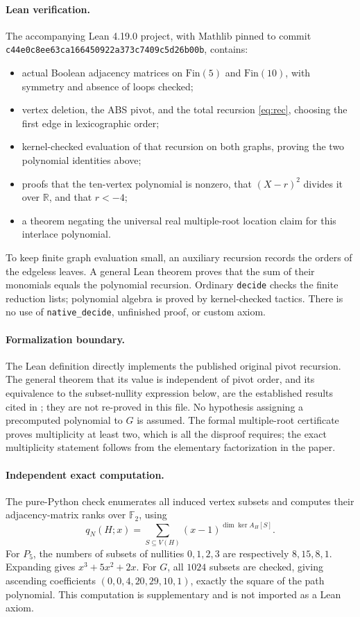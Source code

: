 \documentclass[11pt]{article}
\newcommand{\qN}{q_N}
\begin{document}
\newpage
\paragraph{Lean verification.}
The accompanying Lean 4.19.0 project, with Mathlib pinned to commit
\texttt{c44e0c8ee63ca166450922a373c7409c5d26b00b}, contains:
\begin{itemize}
 \item actual Boolean adjacency matrices on $\mathrm{Fin}(5)$ and
 $\mathrm{Fin}(10)$, with symmetry and absence of loops checked;
 \item vertex deletion, the ABS pivot, and the total recursion
 \eqref{eq:rec}, choosing the first edge in lexicographic order;
 \item kernel-checked evaluation of that recursion on both graphs,
 proving the two polynomial identities above;
 \item proofs that the ten-vertex polynomial is nonzero, that
 $(X-r)^2$ divides it over $\mathbb R$, and that $r<-4$;
 \item a theorem negating the universal real multiple-root location claim
 for this interlace polynomial.
\end{itemize}
To keep finite graph evaluation small, an auxiliary recursion records the
orders of the edgeless leaves. A general Lean theorem proves that the sum
of their monomials equals the polynomial recursion. Ordinary
\texttt{decide} checks the finite reduction lists; polynomial algebra is
proved by kernel-checked tactics. There is no use of \texttt{native\_decide},
unfinished proof, or custom axiom.

\paragraph{Formalization boundary.}
The Lean definition directly implements the published original pivot
recursion. The general theorem that its value is independent of pivot
order, and its equivalence to the subset-nullity expression below, are
the established results cited in \cite{ABS,ABS2}; they are not re-proved
in this file. No hypothesis assigning a precomputed polynomial to $G$
is assumed. The formal multiple-root certificate proves multiplicity at
least two, which is all the disproof requires; the exact multiplicity
statement follows from the elementary factorization in the paper.

\paragraph{Independent exact computation.}
The pure-Python check enumerates all induced vertex subsets and computes
their adjacency-matrix ranks over $\mathbb F_2$, using
\[
 \qN(H;x)=\sum_{S\subseteq V(H)}(x-1)^{\dim\ker A_H[S]}.
\]
For $P_5$, the numbers of subsets of nullities $0,1,2,3$ are respectively
$8,15,8,1$. Expanding gives $x^3+5x^2+2x$. For $G$, all $1024$ subsets are
checked, giving ascending coefficients
$(0,0,4,20,29,10,1)$, exactly the square of the path polynomial.
This computation is supplementary and is not imported as a Lean axiom.
\end{document}
